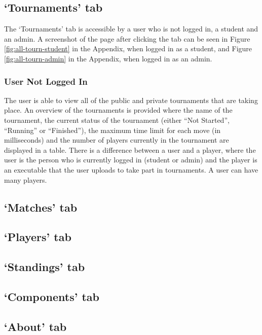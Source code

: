 \documentclass[a4paper, 12pt]{report}
\begin{document}
\subsection{`Tournaments' tab}
\label{sec:impl-tab-tournaments}

The `Tournaments' tab is accessible by a user who is not logged in, a student
and an admin. A screenshot of the page after clicking the tab can be seen in
Figure \ref{fig:all-tourn-student} in the Appendix, when logged in as a student,
and Figure \ref{fig:all-tourn-admin} in the Appendix, when logged in as an
admin.

\subsubsection*{User Not Logged In}

The user is able to view all of the public and private tournaments that are
taking place. An overview of the tournaments is provided where the name of the
tournament, the current status of the tournament (either ``Not Started'',
``Running'' or ``Finished''), the maximum time limit for each move (in milliseconds)
and the number of players currently in the tournament are displayed in a table.
There is a difference between a user and a player, where the user is the person
who is currently logged in (student or admin) and the player is an executable
that the user uploads to take part in tournaments. A user can have many players.

\subsection{`Matches' tab}
\label{sec:impl-tab-matches}

\subsection{`Players' tab}
\label{sec:impl-tab-players}

\subsection{`Standings' tab}
\label{sec:impl-tab-standings}

\subsection{`Components' tab}
\label{sec:impl-tab-components}

\subsection{`About' tab}
\label{sec:impl-tab-about}
\end{document}

